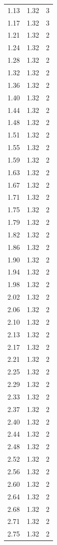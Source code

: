 \begin{longtable}{lrr}
  1.13 & 1.32 & 3 \\
  1.17 & 1.32 & 3 \\
  1.21 & 1.32 & 2 \\
  1.24 & 1.32 & 2 \\
  1.28 & 1.32 & 2 \\
  1.32 & 1.32 & 2 \\
  1.36 & 1.32 & 2 \\
  1.40 & 1.32 & 2 \\
  1.44 & 1.32 & 2 \\
  1.48 & 1.32 & 2 \\
  1.51 & 1.32 & 2 \\
  1.55 & 1.32 & 2 \\
  1.59 & 1.32 & 2 \\
  1.63 & 1.32 & 2 \\
  1.67 & 1.32 & 2 \\
  1.71 & 1.32 & 2 \\
  1.75 & 1.32 & 2 \\
  1.79 & 1.32 & 2 \\
  1.82 & 1.32 & 2 \\
  1.86 & 1.32 & 2 \\
  1.90 & 1.32 & 2 \\
  1.94 & 1.32 & 2 \\
  1.98 & 1.32 & 2 \\
  2.02 & 1.32 & 2 \\
  2.06 & 1.32 & 2 \\
  2.10 & 1.32 & 2 \\
  2.13 & 1.32 & 2 \\
  2.17 & 1.32 & 2 \\
  2.21 & 1.32 & 2 \\
  2.25 & 1.32 & 2 \\
  2.29 & 1.32 & 2 \\
  2.33 & 1.32 & 2 \\
  2.37 & 1.32 & 2 \\
  2.40 & 1.32 & 2 \\
  2.44 & 1.32 & 2 \\
  2.48 & 1.32 & 2 \\
  2.52 & 1.32 & 2 \\
  2.56 & 1.32 & 2 \\
  2.60 & 1.32 & 2 \\
  2.64 & 1.32 & 2 \\
  2.68 & 1.32 & 2 \\
  2.71 & 1.32 & 2 \\
  2.75 & 1.32 & 2 \\

\end{longtable}
